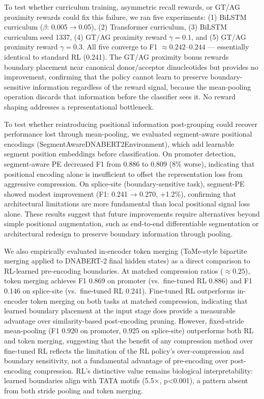 \documentclass[sigconf,screen]{acmart}
\begin{document}
To test whether curriculum training, asymmetric recall rewards, or GT/AG proximity rewards could fix this failure, we ran five experiments: (1) BiLSTM curriculum ($\beta$: 0.005$\to$0.05), (2) Transformer curriculum, (3) BiLSTM curriculum seed 1337, (4) GT/AG proximity reward $\gamma=0.1$, and (5) GT/AG proximity reward $\gamma=0.3$. All five converge to F1 $\approx 0.242\text{--}0.244$ — essentially identical to standard RL (0.241). The GT/AG proximity bonus rewards boundary placement near canonical donor/acceptor dinucleotides but provides no improvement, confirming that the policy cannot learn to preserve boundary-sensitive information regardless of the reward signal, because the mean-pooling operation discards that information before the classifier sees it. No reward shaping addresses a representational bottleneck.

To test whether reintroducing positional information post-grouping could recover performance lost through mean-pooling, we evaluated segment-aware positional encodings (SegmentAwareDNABERT2Environment), which add learnable segment position embeddings before classification. On promoter detection, segment-aware PE decreased F1 from 0.886 to 0.809 (8\% worse), indicating that positional encoding alone is insufficient to offset the representation loss from aggressive compression. On splice-site (boundary-sensitive task), segment-PE showed modest improvement (F1: 0.241 → 0.270, +1.2\%), confirming that architectural limitations are more fundamental than local positional signal loss alone. These results suggest that future improvements require alternatives beyond simple positional augmentation, such as end-to-end differentiable segmentation or architectural redesign to preserve boundary information through pooling.

We also empirically evaluated in-encoder token merging (ToMe-style bipartite merging applied to DNABERT-2 final hidden states) as a direct comparison to RL-learned pre-encoding boundaries. At matched compression ratios ($\approx 0.25$), token merging achieves F1 0.869 on promoter (vs.\ fine-tuned RL 0.886) and F1 0.146 on splice-site (vs.\ fine-tuned RL 0.241). Fine-tuned RL outperforms in-encoder token merging on both tasks at matched compression, indicating that learned boundary placement at the input stage does provide a measurable advantage over similarity-based post-encoding pruning. However, fixed-stride mean-pooling (F1 0.920 on promoter, 0.925 on splice-site) outperforms both RL and token merging, suggesting that the benefit of any compression method over fine-tuned RL reflects the limitation of the RL policy's over-compression and boundary sensitivity, not a fundamental advantage of pre-encoding over post-encoding compression. RL's distinctive value remains biological interpretability: learned boundaries align with TATA motifs (5.5×, p<0.001), a pattern absent from both stride pooling and token merging.
\end{document}
